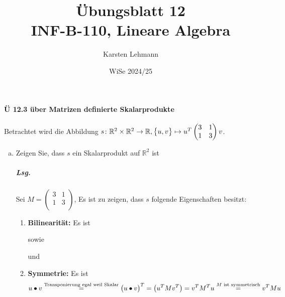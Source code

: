 \documentclass{scrreprt}
\author{Karsten Lehmann}
\date{WiSe 2024/25}
\title{Übungsblatt 12\\INF-B-110, Lineare Algebra}
\begin{document}
\paragraph{Ü 12.3 über Matrizen definierte Skalarprodukte}

Betrachtet wird die Abbildung
$s \colon \mathbb{R}^2 \times \mathbb{R}^2 \to \mathbb{R},
\qty\big{u, v} \mapsto u^T \begin{pmatrix}
  3 & 1 \\
  1 & 3 \\
\end{pmatrix} v$.
\begin{enumerate}[(a)]
\item Zeigen Sie, dass $s$ ein Skalarprodukt auf $\mathbb{R}^2$ ist

  \subparagraph{Lsg.} Sei $M = \begin{pmatrix}
    3 & 1 \\
    1 & 3 \\
  \end{pmatrix}$,
  Es ist zu zeigen, dass $s$ folgende Eigenschaften
  besitzt:
  \begin{enumerate}[(1)]
  \item \textbf{Bilinearität:} Es ist
    sowie
    und

  \item \textbf{Symmetrie:} Es ist
    \[
      u \bullet v \overset{\text{Transponierung egal weil Skalar}}=
      \qty\big(u \bullet v)^T = \qty\big(u^TMv^T)
      = v^TM^Tu
      \overset{M \text{ ist symmetrisch}}= v^TMu
    \]


\end{enumerate}
\end{enumerate}
\end{document}
